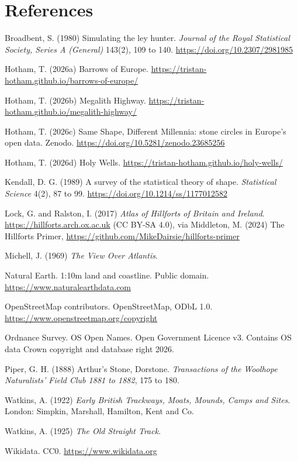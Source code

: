\documentclass[11pt,a4paper]{article}
\begin{document}
\section*{References}
\small
\begin{description}\setlength{\itemsep}{0.15em}
\item Broadbent, S. (1980) Simulating the ley hunter. \emph{Journal of the Royal Statistical Society, Series A (General)} 143(2), 109 to 140. \url{https://doi.org/10.2307/2981985}
\item Hotham, T. (2026a) Barrows of Europe. \url{https://tristan-hotham.github.io/barrows-of-europe/}
\item Hotham, T. (2026b) Megalith Highway. \url{https://tristan-hotham.github.io/megalith-highway/}
\item Hotham, T. (2026c) Same Shape, Different Millennia: stone circles in Europe's open data. Zenodo. \url{https://doi.org/10.5281/zenodo.23685256}
\item Hotham, T. (2026d) Holy Wells. \url{https://tristan-hotham.github.io/holy-wells/}
\item Kendall, D. G. (1989) A survey of the statistical theory of shape. \emph{Statistical Science} 4(2), 87 to 99. \url{https://doi.org/10.1214/ss/1177012582}
\item Lock, G. and Ralston, I. (2017) \emph{Atlas of Hillforts of Britain and Ireland}. \url{https://hillforts.arch.ox.ac.uk} (CC BY-SA 4.0), via Middleton, M. (2024) The Hillforts Primer, \url{https://github.com/MikeDairsie/hillforts-primer}
\item Michell, J. (1969) \emph{The View Over Atlantis}.
\item Natural Earth. 1:10m land and coastline. Public domain. \url{https://www.naturalearthdata.com}
\item OpenStreetMap contributors. OpenStreetMap, ODbL 1.0. \url{https://www.openstreetmap.org/copyright}
\item Ordnance Survey. OS Open Names. Open Government Licence v3. Contains OS data \textcopyright{} Crown copyright and database right 2026.
\item Piper, G. H. (1888) Arthur's Stone, Dorstone. \emph{Transactions of the Woolhope Naturalists' Field Club 1881 to 1882}, 175 to 180.
\item Watkins, A. (1922) \emph{Early British Trackways, Moats, Mounds, Camps and Sites}. London: Simpkin, Marshall, Hamilton, Kent and Co.
\item Watkins, A. (1925) \emph{The Old Straight Track}.
\item Wikidata. CC0. \url{https://www.wikidata.org}

\end{description}
\end{document}
